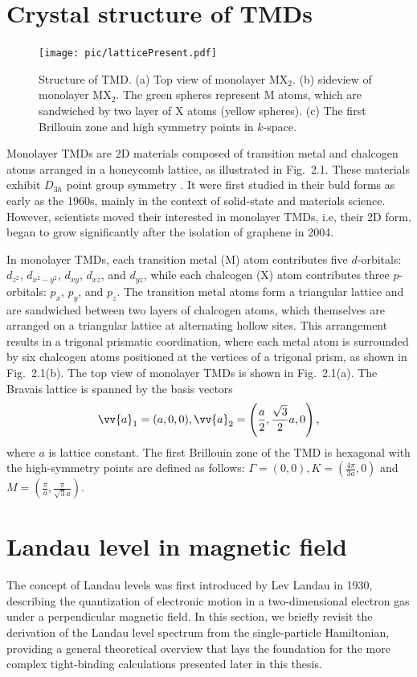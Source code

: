 \section{Crystal structure of TMDs}

\begin{figure}[H]
	\centering
	\texttt{[image: pic/latticePresent.pdf]}
	\caption[Structure of TMD.]{\label{fig:Lattice}Structure of TMD. (a) Top view of monolayer MX$_{2}$. (b) sideview of monolayer MX$_{2}$. The green spheres represent M atoms, which are sandwiched by two layer of X atoms (yellow spheres). (c) The first Brillouin zone and high symmetry points in $k$-space.}
\end{figure}
Monolayer \acp{TMD} are \ac{2D} materials composed of transition metal and chalcogen atoms arranged in a honeycomb lattice, as illustrated in Fig.~2.1. These materials exhibit $D_{3h}$ point group symmetry \cite{mattheiss1973}. It were first studied in their buld forms as early as the 1960s, mainly in the context of solid-state and materials science. However, scientists moved their interested in monolayer TMDs, i.e, their \ac{2D} form, began to grow significantly after the isolation of graphene in 2004.

In monolayer \acp{TMD}, each transition metal (M) atom contributes five $d$-orbitals: $d_{z^{2}}$, $d_{x^{2} - y^{2}}$, $d_{xy}$, $d_{xz}$, and $d_{yz}$, while each chalcogen (X) atom contributes three $p$-orbitals: $p_{x}$, $p_{y}$, and $p_{z}$. The transition metal atoms form a triangular lattice and are sandwiched between two layers of chalcogen atoms, which themselves are arranged on a triangular lattice at alternating hollow sites. This arrangement results in a trigonal prismatic coordination, where each metal atom is surrounded by six chalcogen atoms positioned at the vertices of a trigonal prism, as shown in Fig.~2.1(b). The top view of monolayer \acp{TMD} is shown in Fig.~2.1(a). The Bravais lattice is spanned by the basis vectors
\begin{gather}
	\vv{a}_{1} = (a,0,0), \vv{a}_{2} = \left( \frac{a}{2}, \frac{\sqrt{3}}{2}a,0 \right),
\end{gather}
where $a$ is lattice constant. The first Brillouin zone of the \ac{TMD} is hexagonal with the high-symmetry points are defined as follows: $\Gamma = (0,0), K = (\tfrac{4\pi}{3a},0)$ and $M = (\tfrac{\pi}{a}, \tfrac{\pi}{\sqrt{3}a})$.





\section{Landau level in magnetic field}
The concept of Landau levels was first introduced by Lev Landau in 1930, describing the quantization of electronic motion in a two-dimensional electron gas under a perpendicular magnetic field. In this section, we briefly revisit the derivation of the Landau level spectrum from the single-particle Hamiltonian, providing a general theoretical overview that lays the foundation for the more complex tight-binding calculations presented later in this thesis.

